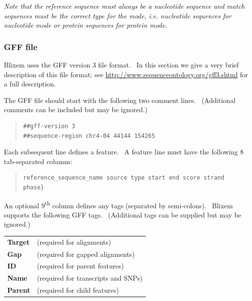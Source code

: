 \documentclass[letterpaper]{article}
\begin{document}
\bigskip

{\itshape
Note that the reference sequence must always be a nucleotide sequence
and match sequences must be the correct type for the mode, i.e.
nucleotide sequences for nucleotide mode or protein sequences for
protein mode.}

{\color[rgb]{0.30980393,0.5058824,0.7411765}\subsubsection[GFF file]{GFF file}}
\hypertarget{RefHeading1521056909880}{}{
Blixem uses the GFF version 3 file format. \ In this section we give a
very brief description of this file format; see
\url{http://www.sequenceontology.org/gff3.shtml} for a full
description.}

\bigskip

{The GFF file should start with the following two comment lines.
\ (Additional comments can be included but may be ignored.)
\begin{quote}
\begin{verbatim}
##gff-version 3
##sequence-region chr4-04 44144 154265
\end{verbatim}
\end{quote}
Each subsequent line defines a feature. \ A feature line must have the
following 8 tab-separated columns:
\begin{quote}
\begin{verbatim}
reference_sequence_name source type start end score strand phase}
\end{verbatim}
\end{quote}
An optional 9\textsuperscript{th} column defines any tags (separated by
semi-colons). \ Blixem supports the following GFF tags. \ (Additional
tags can be supplied but may be ignored.)}
\begin{center}
\begin{supertabular}{p{2.802cm}p{10.704cm}} 
\textbf{Target } & (required for alignments) \\
\textbf{Gap}  & (required for gapped alignments) \\
\textbf{ID } & (required for parent features) \\
\textbf{Name } & (required for transcripts and SNPs) \\
\textbf{Parent } & (required for child features) \\
\end{supertabular}
\end{center}
\end{document}
